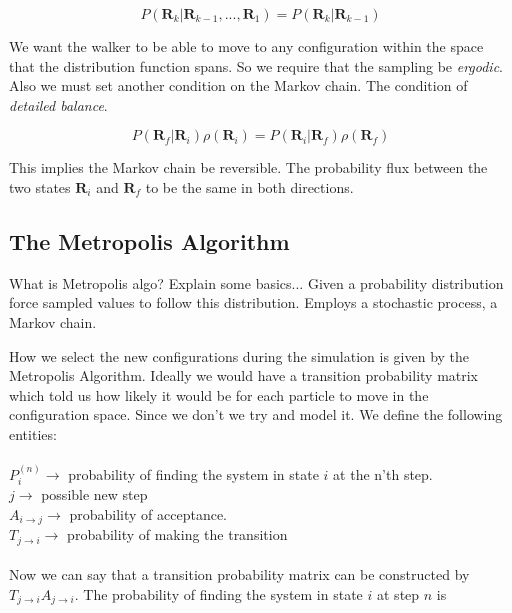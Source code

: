 \begin{equation}
P(\mathbf{R}_k|\mathbf{R}_{k-1}, ...,\mathbf{R}_1) = P(\mathbf{R}_k|\mathbf{R}_{k-1})
\end{equation}

We want the walker to be able to move to any configuration within the space that the distribution function spans. So we require that the sampling be \textit{ergodic}. Also we must set another condition on the Markov chain. The condition of \textit{detailed balance}. 

\begin{equation}
P(\mathbf{R}_f|\mathbf{R}_i) \rho(\mathbf{R}_i) = P(\mathbf{R}_i|\mathbf{R}_f) \rho(\mathbf{R}_f)
\end{equation}

This implies the Markov chain be reversible. The probability flux between the two states $\mathbf{R}_i$ and $\mathbf{R}_f$ to be the same in both directions. \cite{toulouse2016introduction}



\subsection{The Metropolis Algorithm}

What is Metropolis algo? Explain some basics...
Given a probability distribution force sampled values to follow this distribution. Employs a stochastic process, a Markov chain.

How we select the new configurations during the simulation is given by the Metropolis Algorithm. 
Ideally we would have a transition probability matrix which told us how likely it would be for each particle to move in the configuration space. Since we don't we try and model it.
We define the following entities:
\\
\\
$P_i^{(n)} \rightarrow$ probability of finding the system in state $i$ at the n'th step.
\\
$j \rightarrow$ possible new step
\\
$A_{i \rightarrow j} \rightarrow$ probability of acceptance. 
\\
$T_{j \rightarrow i} \rightarrow$ probability of making the transition  
\\
\\
Now we can say that a transition probability matrix can be constructed by $T_{j \rightarrow i}A_{j \rightarrow i}.$ The probability of finding the system in state $i$ at step $n$ is

